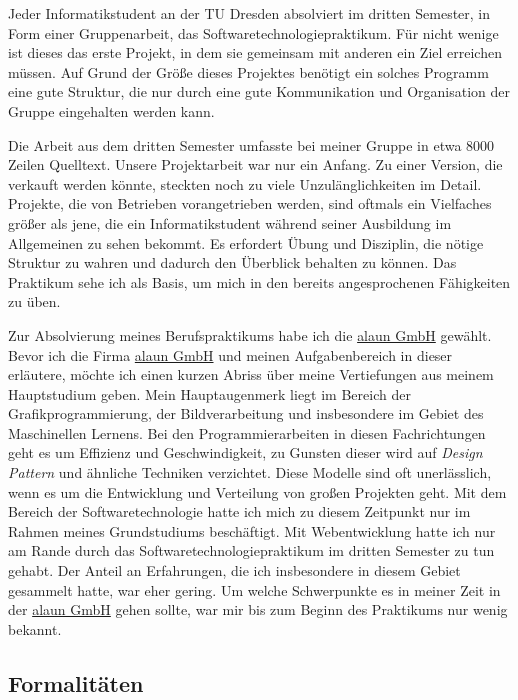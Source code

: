 \documentclass[12pt]{article}
\begin{document}
Jeder Informatikstudent an der TU Dresden absolviert im dritten Semester, in Form einer Gruppenarbeit, das Softwaretechnologiepraktikum.
Für nicht wenige ist dieses das erste Projekt, in dem sie gemeinsam mit anderen ein Ziel erreichen müssen. 
Auf Grund der Größe dieses Projektes benötigt ein solches Programm eine gute Struktur, die nur durch eine
gute Kommunikation und Organisation der Gruppe eingehalten werden kann.

Die Arbeit aus dem dritten Semester umfasste bei meiner Gruppe in etwa 8000 Zeilen Quelltext. 
Unsere Projektarbeit war nur ein Anfang. Zu einer Version, die verkauft werden könnte, steckten noch zu viele Unzulänglichkeiten
im Detail.
Projekte, die von Betrieben vorangetrieben werden, sind oftmals ein Vielfaches größer als jene, die ein
Informatikstudent während seiner Ausbildung im Allgemeinen zu sehen bekommt.
Es erfordert Übung und Disziplin, die nötige Struktur zu wahren und dadurch den Überblick behalten zu können.
Das Praktikum sehe ich als Basis, um mich in den bereits angesprochenen Fähigkeiten zu üben.

Zur Absolvierung meines Berufspraktikums habe ich die \href{https://alaun.de/home/}{alaun GmbH} gewählt.
Bevor ich die Firma \href{https://alaun.de/home/}{alaun GmbH} und meinen Aufgabenbereich in dieser erläutere,
 möchte ich einen kurzen Abriss über meine Vertiefungen aus meinem Hauptstudium geben. 
Mein Hauptaugenmerk liegt im Bereich der Grafikprogrammierung, der Bildverarbeitung und insbesondere im Gebiet des Maschinellen Lernens.
Bei den Programmierarbeiten in diesen Fachrichtungen geht es um Effizienz und Geschwindigkeit, zu Gunsten dieser wird auf
\textit{Design Pattern} und ähnliche Techniken verzichtet. Diese Modelle sind oft unerlässlich, wenn es um die
Entwicklung und Verteilung von großen Projekten geht.
Mit dem Bereich der Softwaretechnologie hatte ich mich zu diesem Zeitpunkt nur im Rahmen meines Grundstudiums beschäftigt. 
Mit Webentwicklung hatte ich nur am Rande durch das Softwaretechnologiepraktikum im dritten Semester zu tun gehabt.
Der Anteil an Erfahrungen, die ich insbesondere in diesem Gebiet gesammelt hatte, war eher gering.
Um welche Schwerpunkte es in meiner Zeit in der \href{https://alaun.de/home/}{alaun GmbH} gehen sollte, war mir bis zum
Beginn des Praktikums nur wenig bekannt.

\subsection{Formalitäten}
\end{document}
